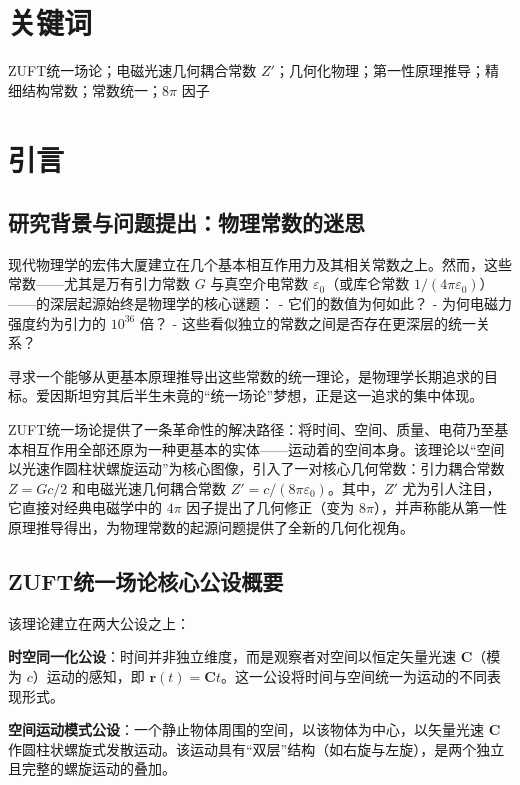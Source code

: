 \documentclass[a4paper,12pt]{article}
\theoremstyle{plain}
\renewcommand{\vec}[1]{\bm{#1}}
\begin{document}
\section*{关键词}
ZUFT统一场论；电磁光速几何耦合常数 $Z'$；几何化物理；第一性原理推导；精细结构常数；常数统一；$8\pi$ 因子

\vspace{1cm}

\tableofcontents

\newpage

\section{引言}
\subsection{研究背景与问题提出：物理常数的迷思}
现代物理学的宏伟大厦建立在几个基本相互作用力及其相关常数之上。然而，这些常数——尤其是万有引力常数 $G$ 与真空介电常数 $\varepsilon_0$（或库仑常数 $1/(4\pi\varepsilon_0)$）——的深层起源始终是物理学的核心谜题：
- 它们的数值为何如此？
- 为何电磁力强度约为引力的 $10^{36}$ 倍？
- 这些看似独立的常数之间是否存在更深层的统一关系？

寻求一个能够从更基本原理推导出这些常数的统一理论，是物理学长期追求的目标。爱因斯坦穷其后半生未竟的“统一场论”梦想，正是这一追求的集中体现。

ZUFT统一场论提供了一条革命性的解决路径：将时间、空间、质量、电荷乃至基本相互作用全部还原为一种更基本的实体——运动着的空间本身。该理论以“空间以光速作圆柱状螺旋运动”为核心图像，引入了一对核心几何常数：引力耦合常数 $Z = Gc/2$ 和电磁光速几何耦合常数 $Z' = c/(8\pi\varepsilon_0)$。其中，$Z'$ 尤为引人注目，它直接对经典电磁学中的 $4\pi$ 因子提出了几何修正（变为 $8\pi$），并声称能从第一性原理推导得出，为物理常数的起源问题提供了全新的几何化视角。

\subsection{ZUFT统一场论核心公设概要}
该理论建立在两大公设之上：

\textbf{时空同一化公设}：时间并非独立维度，而是观察者对空间以恒定矢量光速 $\vec{C}$（模为 $c$）运动的感知，即 $\vec{r}(t) = \vec{C}t$。这一公设将时间与空间统一为运动的不同表现形式。

\textbf{空间运动模式公设}：一个静止物体周围的空间，以该物体为中心，以矢量光速 $\vec{C}$ 作圆柱状螺旋式发散运动。该运动具有“双层”结构（如右旋与左旋），是两个独立且完整的螺旋运动的叠加。
\end{document}
